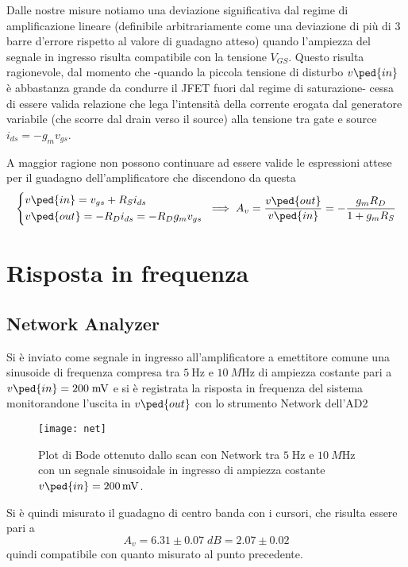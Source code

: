 \documentclass[10pt, a4paper, italian]{article}
\begin{document}
Dalle nostre misure notiamo una deviazione significativa dal regime di
amplificazione lineare (definibile arbitrariamente come una deviazione di più
di 3 barre d'errore rispetto al valore di guadagno atteso) quando l'ampiezza
del segnale in ingresso risulta compatibile con la tensione $V_{GS}$. Questo
risulta ragionevole, dal momento che -quando la piccola tensione di disturbo
$v\ped{in}$ è abbastanza grande da condurre il JFET fuori dal regime di
saturazione- cessa di essere valida relazione che lega l'intensità della
corrente erogata dal generatore variabile (che scorre dal drain verso il
source) alla tensione tra gate e source $i_{ds} = -g_m v_{gs}$.

A maggior ragione non possono continuare ad essere valide le espressioni
attese per il guadagno dell'amplificatore che discendono da questa
\[
\begin{dcases}
v\ped{in} = v_{gs} + R_S i_{ds} \\
%
v\ped{out} = - R_D i_{ds} = - R_D g_m v_{gs} \\
\end{dcases}
\: \implies A_v = \frac{v\ped{out}}{v\ped{in}} =
- \frac{g_m R_D}{1 + g_m R_S}
\]
\section{Risposta in frequenza}
\subsection{Network Analyzer}
Si è inviato come segnale in ingresso all'amplificatore a emettitore comune una
sinusoide di frequenza compresa tra $\SI{5}{\Hz}$ e $\SI{10}{M\Hz}$ di
ampiezza costante pari a $v\ped{in} = 200 \; \si{m\V}$ e si è registrata la
risposta in frequenza del sistema monitorandone l'uscita in $v\ped{out}$ con
lo strumento Network dell'AD2
\begin{figure}[htbp]
    \centering
	\texttt{[image: net]}
    \caption{Plot di Bode ottenuto dallo scan con Network tra $5 \; \si{\Hz}$ e
$\SI{10}{M\Hz}$ con un segnale sinusoidale in ingresso di ampiezza costante
$v\ped{in} = \SI{200}{m\V}$. \label{fig: bodeplot}}
\end{figure}

Si è quindi misurato il guadagno di centro banda con i cursori, che risulta
essere pari a
\[
A_v = 6.31 \pm 0.07 \; \si{dB} = 2.07 \pm 0.02
\]
quindi compatibile con quanto misurato al punto precedente.
\end{document}
